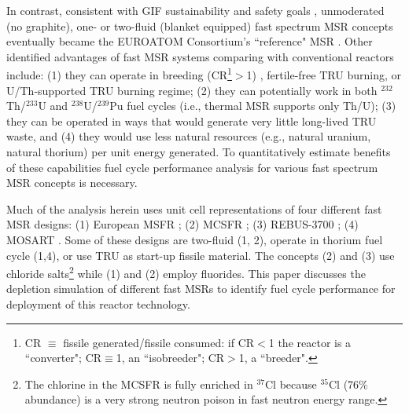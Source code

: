 \documentclass[letterpaper]{mandc2019}
\begin{document}
In contrast, consistent with \gls{GIF} sustainability and safety goals \cite{gif_generation_2015}, unmoderated (no graphite), one- or two-fluid (blanket equipped) fast spectrum \gls{MSR} concepts eventually became the EUROATOM Consortium's ``reference" \gls{MSR} \cite{noauthor_final_2015}. Other identified advantages of fast \gls{MSR} systems comparing with conventional reactors include: (1) they can operate in breeding (CR\footnote{\gls{CR} $\equiv$ fissile generated/fissile consumed: if CR$<$1 the reactor is a ``converter"; CR$\equiv$1, an ``isobreeder"; CR$>$1, a ``breeder".}$>$1) \cite{noauthor_final_2015,simmons_assessment_1974,mourogov_potentialities_2006}, fertile-free \gls{TRU} burning, or U/Th-supported \gls{TRU} burning \cite{ignatiev_progress_2007} regime; (2) they can potentially work in both $^{232}$Th/$^{233}$U and $^{238}$U/$^{239}$Pu fuel cycles (i.e., thermal \gls{MSR} supports only Th/U); (3) they can be operated in ways that would generate very little long-lived \gls{TRU} waste, and (4) they would use less natural resources (e.g., natural uranium, natural thorium) per unit energy generated. To quantitatively estimate benefits of these capabilities fuel cycle performance analysis for various fast spectrum \gls{MSR} concepts is necessary.

Much of the analysis herein uses unit cell representations of four different fast \gls{MSR} designs: 
(1) European \gls{MSFR} \cite{noauthor_final_2015}; (2) \gls{MCSFR} \cite{simmons_assessment_1974}; (3) REBUS-3700 \cite{mourogov_potentialities_2006}; (4) \gls{MOSART} \cite{ignatiev_progress_2007}. Some of these designs are two-fluid (1, 2), operate in thorium fuel cycle (1,4), or use \gls{TRU} as start-up fissile material. The concepts (2) and (3) use chloride salts\footnote{The chlorine in the \gls{MCSFR} is fully enriched in $^{37}$Cl because $^{35}$Cl (76\% abundance) is a very strong neutron poison in fast neutron energy range.} while (1) and (2) employ fluorides. This paper discusses the depletion simulation of different fast \glspl{MSR} to identify fuel cycle performance for deployment of this reactor technology.
\end{document}
